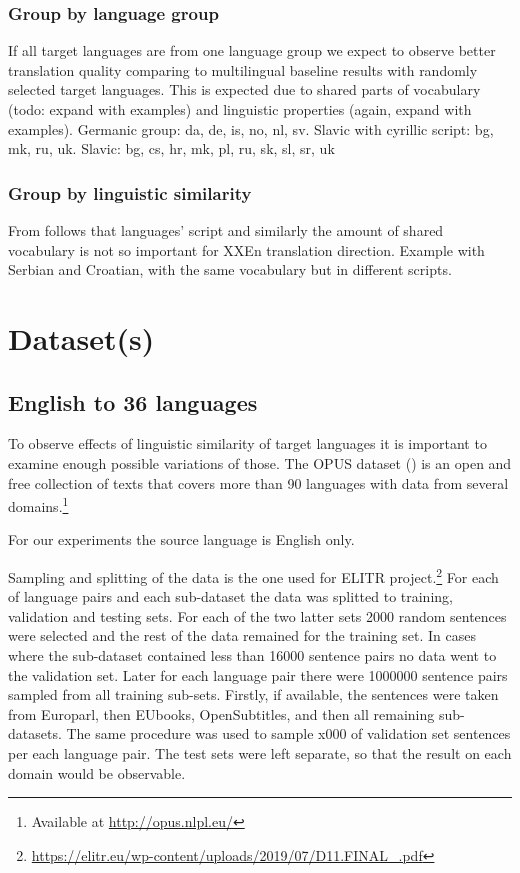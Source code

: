 \subsubsection*{Group by language group}

If all target languages are from one language group we expect to observe
better translation quality comparing to multilingual baseline results 
with randomly selected target languages.
This is expected due to shared parts of vocabulary (todo: expand with examples)
and linguistic properties (again, expand with examples).
Germanic group: da, de, is, no, nl, sv.
Slavic with cyrillic script: bg, mk, ru, uk.
Slavic: bg, cs, hr, mk, pl, ru, sk, sl, sr, uk

\subsubsection*{Group by linguistic similarity}

From  follows that languages' script
and similarly the amount of shared vocabulary is not so important
for XX\to{}En translation direction.
Example with Serbian and Croatian, with the same vocabulary but
in different scripts.





\section{Dataset(s)}
\label{section:datasets}


\subsection{English to 36 languages}
\label{dataset:en-to-36}

To observe effects of linguistic similarity of target languages
it is important to examine enough possible variations of those.
The OPUS dataset (\cite{TIEDEMANN12.463}) is an open and free collection of texts
that covers more than 90 languages with data from several
domains.\footnote{Available at \url{http://opus.nlpl.eu/}} 

For our experiments the source language is English only.

Sampling and splitting of the data is the one used for
ELITR project.\footnote{\url{https://elitr.eu/wp-content/uploads/2019/07/D11.FINAL_.pdf}}
For each of language pairs and each sub-dataset
the data was splitted to training, validation and testing sets.
For each of the two latter sets 2000 random sentences were selected
and the rest of the data remained for the training set.
In cases where the sub-dataset contained less than 16000 sentence pairs
no data went to the validation set.
Later for each language pair there were 1000000 sentence pairs
sampled from all training sub-sets.
Firstly, if available, the sentences were taken from Europarl,
then EUbooks, OpenSubtitles, and then all remaining sub-datasets.
The same procedure was used to sample x000 of validation set sentences
per each language pair.
The test sets were left separate, so that the result on each domain would be observable.

